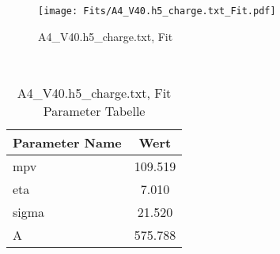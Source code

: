 \begin{figure}[ht] 
 	\centering 
 	\texttt{[image: Fits/A4\_V40.h5\_charge.txt\_Fit.pdf]} 
	\caption{A4_V40.h5_charge.txt, Fit} 
 	\label{fig:A4_V40.h5_charge.txt, Fit} 
\end{figure}
 \\ 
\begin{table}[ht] 
\centering 
\caption{A4_V40.h5_charge.txt, Fit Parameter Tabelle} 
\label{tab:my-table}
\begin{tabular}{|l|c|}
\hline
Parameter Name	&	Wert \\ \hline
mpv	&	 109.519\\ \hline
eta	&	 7.010\\ \hline
sigma	&	 21.520\\ \hline
A	&	 575.788\\ \hline
\end{tabular} 
\end{table}